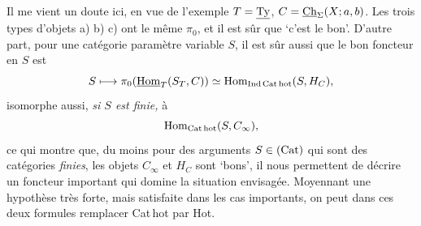 Il me vient un doute ici, en vue de l'exemple $T = \underline{\mathrm{Ty}}$, $C = \underline{\mathrm{Ch}}_{\Sigma}(X;a,b)$. Les trois types d'objets a) b) c) ont le même $\pi_{0}$, et il est sûr que ‘c'est le bon'. D'autre part, pour une catégorie paramètre variable $S$, il est sûr aussi que le bon foncteur en $S$ est
\[
S \longmapsto \pi_{0}(\underline{\mathrm{Hom}}_{T}(S_{T},C)) \simeq \mathrm{Hom}_{\mathrm{Ind}\,\mathrm{Cat\,hot}}(S,H_{C}),
\]
isomorphe aussi, \textit{si $S$ est finie,} à
\[
\mathrm{Hom}_{\mathrm{Cat\,hot}}(S,C_{\infty}),
\]
ce qui montre que, du moins pour des arguments $S \in (\mathrm{Cat})$ qui sont des catégories \textit{finies}, les objets
$C_{\infty}$ et $H_{C}$ sont ‘bons', il nous permettent %
de décrire un foncteur important qui domine la situation envisagée. Moyennant une hypothèse très forte, mais satisfaite dans les cas importants, on peut dans ces deux formules remplacer Cat\,hot par Hot.

